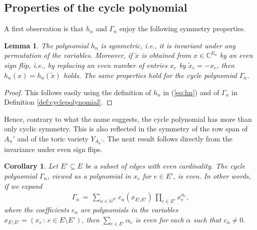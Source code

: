 \documentclass[a4paper, 11pt, twoside]{article}
\theoremstyle{plain}
\newtheorem{lemma}[theorem]{Lemma}
\newtheorem{corollary}[theorem]{Corollary}
\begin{document}
\subsection{Properties  of the cycle polynomial}
A first observation is that $h_n$ and $\Gamma_n$ enjoy   the following symmetry properties. 

\begin{lemma} \label{lem:symmetry}
    The polynomial $h_n$ is symmetric, i.e., it is invariant under any permutation of the variables.
    Moreover, if $\tilde{x}$ is obtained from $x \in \mathbb{C}^{E_n}$ by an even sign flip, i.e., by replacing an even number of entries $x_e$ by $\tilde{x}_e = -x_e$, then $h_n(x) = h_n(\tilde{x})$ holds. 
    The same properties hold for the cycle polynomial $\Gamma_n$. 
\end{lemma}

\begin{proof}
This follows easily using the definition of $h_n$ in (\ref{eq:hn}) and of $\Gamma_n$ in Definition \ref{def:cyclepolynomial}.
 \end{proof}



Hence, contrary to what the name suggests, the cycle polynomial has more than only cyclic symmetry. This is also reflected in the symmetry of the row span of $A_n'$ and of the toric variety $Y_{A_n'}$. 
 The next result follows directly from the invariance under even sign flips.
 
\begin{corollary} \label{cor:even}
    Let $E' \subseteq E$ be a subset of edges with even cardinality. The cycle polynomial $\Gamma_n$, viewed as a polynomial in $x_e$ for $e \in E'$, is even. In other words, if we expand
    \begin{align}\label{eq:cycle-even}
     \Gamma_n \, = \, \sum_{\alpha \in \mathbb{N}^{E'}} c_\alpha(x_{E \setminus E'}) \, \prod_{e \in E'} x_e^{\alpha_e}, 
     \end{align}
    where the coefficients $c_\alpha$ are polynomials in the variables $x_{E \setminus E'} = (x_e \, : \, e \in E \setminus E')$, then $\sum_{e \in E'} \alpha_e$ is even for each $\alpha$ such that $c_\alpha \neq 0$. 
\end{corollary}
\end{document}
